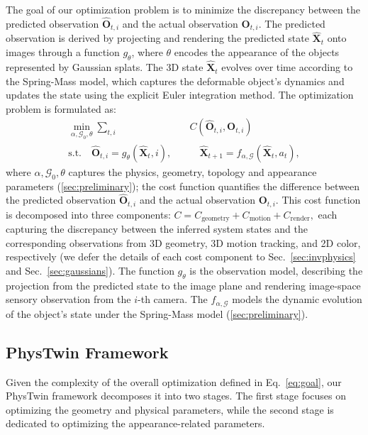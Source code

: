 The goal of our optimization problem is to minimize the discrepancy between the predicted observation \( \hat{\mathbf{O}}_{t,i} \) and the actual observation \( \mathbf{O}_{t,i} \). The predicted observation is derived by projecting and rendering the predicted state \( \hat{\mathbf{X}}_t \) onto images through a function \( g_\theta \), where $\theta$ encodes the appearance of the objects represented by Gaussian splats. The 3D state \( \hat{\mathbf{X}}_t \) evolves over time according to the Spring-Mass model, which captures the deformable object's dynamics and updates the state using the explicit Euler integration method. The optimization problem is formulated as:
\begin{equation}
\label{eq:goal}
\begin{aligned}
    \min_{\alpha, \mathcal{G}_0, \theta} \sum_{t, i} &C(\hat{\mathbf{O}}_{t, i}, \mathbf{O}_{t,i}) \\
    \text{s.t.} \quad \hat{\mathbf{O}}_{t, i} = g_\theta(\hat{\mathbf{X}}_{t}, i),  \quad&\quad \hat{\mathbf{X}}_{t+1} = f_{\alpha, \mathcal{G}} (\hat{\mathbf{X}}_{t}, a_t),
\end{aligned}
\end{equation}
where $\alpha, \mathcal{G}_0, \theta$ captures the physics, geometry, topology and appearance parameters (\cref{sec:preliminary}); the cost function quantifies the difference between the predicted observation \( \hat{\mathbf{O}}_{t,i} \) and the actual observation \( \mathbf{O}_{t,i} \). This cost function is decomposed into three components:
$
C = C_{\mathrm{geometry}} + C_{\mathrm{motion}} + C_{\mathrm{render}},
$
each capturing the discrepancy between the inferred system states and the corresponding observations from 3D geometry, 3D motion tracking, and 2D color, respectively (we defer the details of each cost component to Sec.~\ref{sec:invphysics} and Sec.~\ref{sec:gaussians}).
The function \( g_\theta \) is the observation model, describing the projection from the predicted state to the image plane and rendering image-space sensory observation from the $i$-th camera. The \( f_{\alpha, \mathcal{G}} \) models the dynamic evolution of the object’s state under the Spring-Mass model (\cref{sec:preliminary}).

\subsection{PhysTwin Framework}

Given the complexity of the overall optimization defined in Eq.~\ref{eq:goal}, our PhysTwin framework decomposes it into two stages. The first stage focuses on optimizing the geometry and physical parameters, while the second stage is dedicated to optimizing the appearance-related parameters.


